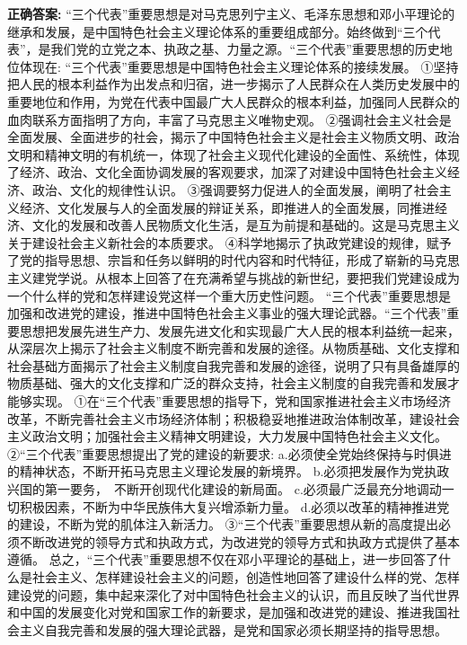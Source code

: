 \documentclass[12pt,UTF8]{ctexart}
\begin{document}
\textbf{正确答案:}
“三个代表”重要思想是对马克思列宁主义、毛泽东思想和邓小平理论的继承和发展，是中国特色社会主义理论体系的重要组成部分。始终做到“三个代表”，是我们党的立党之本、执政之基、力量之源。“三个代表”重要思想的历史地位体现在:
“三个代表”重要思想是中国特色社会主义理论体系的接续发展。
①坚持把人民的根本利益作为出发点和归宿，进一步揭示了人民群众在人类历史发展中的重要地位和作用，为党在代表中国最广大人民群众的根本利益，加强同人民群众的血肉联系方面指明了方向，丰富了马克思主义唯物史观。
②强调社会主义社会是全面发展、全面进步的社会，揭示了中国特色社会主义是社会主义物质文明、政治文明和精神文明的有机统一，体现了社会主义现代化建设的全面性、系统性，体现了经济、政治、文化全面协调发展的客观要求，加深了对建设中国特色社会主义经济、政治、文化的规律性认识。
③强调要努力促进人的全面发展，阐明了社会主义经济、文化发展与人的全面发展的辩证关系，即推进人的全面发展，同推进经济、文化的发展和改善人民物质文化生活，是互为前提和基础的。这是马克思主义关于建设社会主义新社会的本质要求。
④科学地揭示了执政党建设的规律，赋予了党的指导思想、宗旨和任务以鲜明的时代内容和时代特征，形成了崭新的马克思主义建党学说。从根本上回答了在充满希望与挑战的新世纪，要把我们党建设成为一个什么样的党和怎样建设党这样一个重大历史性问题。
“三个代表”重要思想是加强和改进党的建设，推进中国特色社会主义事业的强大理论武器。“三个代表”重要思想把发展先进生产力、发展先进文化和实现最广大人民的根本利益统一起来，从深层次上揭示了社会主义制度不断完善和发展的途径。从物质基础、文化支撑和社会基础方面揭示了社会主义制度自我完善和发展的途径，说明了只有具备雄厚的物质基础、强大的文化支撑和广泛的群众支持，社会主义制度的自我完善和发展才能够实现。
①在“三个代表”重要思想的指导下，党和国家推进社会主义市场经济改革，不断完善社会主义市场经济体制；积极稳妥地推进政治体制改革，建设社会主义政治文明；加强社会主义精神文明建设，大力发展中国特色社会主义文化。
②“三个代表”重要思想提出了党的建设的新要求:
a.必须使全党始终保持与时俱进的精神状态，不断开拓马克思主义理论发展的新境界。
b.必须把发展作为党执政兴国的第一要务， 不断开创现代化建设的新局面。
c.必须最广泛最充分地调动一切积极因素，不断为中华民族伟大复兴增添新力量。
d.必须以改革的精神推进党的建设，不断为党的肌体注入新活力。
③“三个代表”重要思想从新的高度提出必须不断改进党的领导方式和执政方式，为改进党的领导方式和执政方式提供了基本遵循。
总之，“三个代表”重要思想不仅在邓小平理论的基础上，进一步回答了什么是社会主义、怎样建设社会主义的问题，创造性地回答了建设什么样的党、怎样建设党的问题，集中起来深化了对中国特色社会主义的认识，而且反映了当代世界和中国的发展变化对党和国家工作的新要求，是加强和改进党的建设、推进我国社会主义自我完善和发展的强大理论武器，是党和国家必须长期坚持的指导思想。
\end{document}
